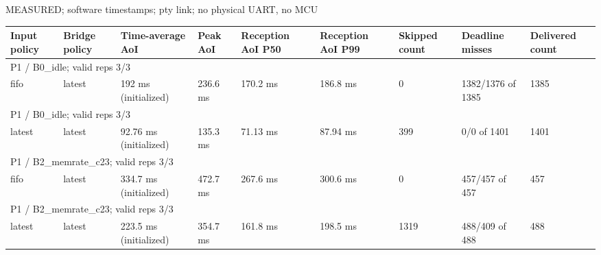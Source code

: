 \par\noindent MEASURED; software timestamps; pty link; no physical UART, no MCU\par
\begin{tabular}{lllllllll}
\toprule
Input policy & Bridge policy & Time-average AoI & Peak AoI & Reception AoI P50 & Reception AoI P99 & Skipped count & Deadline misses & Delivered count \\
\midrule
\multicolumn{9}{l}{P1 / B0\_idle; valid reps 3/3} \\
fifo & latest & 192 ms (initialized) & 236.6 ms & 170.2 ms & 186.8 ms & 0 & 1382/1376 of 1385 & 1385 \\
\multicolumn{9}{l}{P1 / B0\_idle; valid reps 3/3} \\
latest & latest & 92.76 ms (initialized) & 135.3 ms & 71.13 ms & 87.94 ms & 399 & 0/0 of 1401 & 1401 \\
\multicolumn{9}{l}{P1 / B2\_memrate\_c23; valid reps 3/3} \\
fifo & latest & 334.7 ms (initialized) & 472.7 ms & 267.6 ms & 300.6 ms & 0 & 457/457 of 457 & 457 \\
\multicolumn{9}{l}{P1 / B2\_memrate\_c23; valid reps 3/3} \\
latest & latest & 223.5 ms (initialized) & 354.7 ms & 161.8 ms & 198.5 ms & 1319 & 488/409 of 488 & 488 \\
\bottomrule
\end{tabular}
